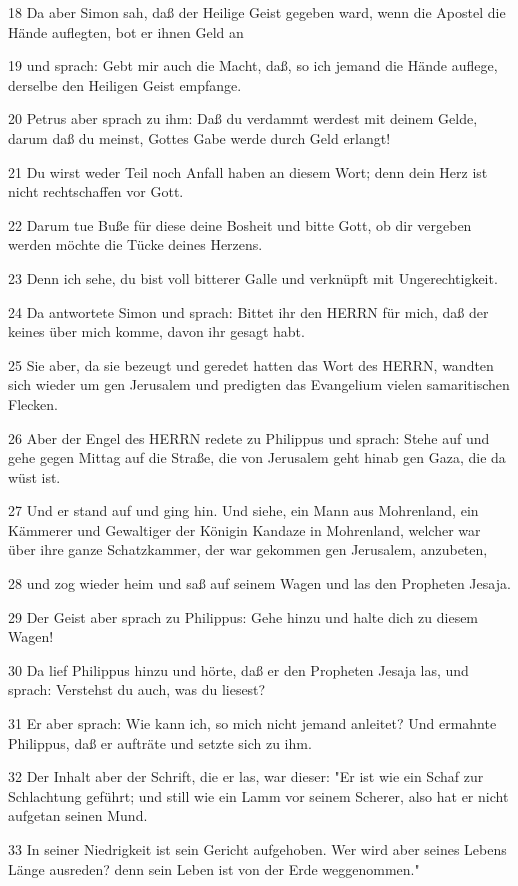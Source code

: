 \par 18 Da aber Simon sah, daß der Heilige Geist gegeben ward, wenn die Apostel die Hände auflegten, bot er ihnen Geld an
\par 19 und sprach: Gebt mir auch die Macht, daß, so ich jemand die Hände auflege, derselbe den Heiligen Geist empfange.
\par 20 Petrus aber sprach zu ihm: Daß du verdammt werdest mit deinem Gelde, darum daß du meinst, Gottes Gabe werde durch Geld erlangt!
\par 21 Du wirst weder Teil noch Anfall haben an diesem Wort; denn dein Herz ist nicht rechtschaffen vor Gott.
\par 22 Darum tue Buße für diese deine Bosheit und bitte Gott, ob dir vergeben werden möchte die Tücke deines Herzens.
\par 23 Denn ich sehe, du bist voll bitterer Galle und verknüpft mit Ungerechtigkeit.
\par 24 Da antwortete Simon und sprach: Bittet ihr den HERRN für mich, daß der keines über mich komme, davon ihr gesagt habt.
\par 25 Sie aber, da sie bezeugt und geredet hatten das Wort des HERRN, wandten sich wieder um gen Jerusalem und predigten das Evangelium vielen samaritischen Flecken.
\par 26 Aber der Engel des HERRN redete zu Philippus und sprach: Stehe auf und gehe gegen Mittag auf die Straße, die von Jerusalem geht hinab gen Gaza, die da wüst ist.
\par 27 Und er stand auf und ging hin. Und siehe, ein Mann aus Mohrenland, ein Kämmerer und Gewaltiger der Königin Kandaze in Mohrenland, welcher war über ihre ganze Schatzkammer, der war gekommen gen Jerusalem, anzubeten,
\par 28 und zog wieder heim und saß auf seinem Wagen und las den Propheten Jesaja.
\par 29 Der Geist aber sprach zu Philippus: Gehe hinzu und halte dich zu diesem Wagen!
\par 30 Da lief Philippus hinzu und hörte, daß er den Propheten Jesaja las, und sprach: Verstehst du auch, was du liesest?
\par 31 Er aber sprach: Wie kann ich, so mich nicht jemand anleitet? Und ermahnte Philippus, daß er aufträte und setzte sich zu ihm.
\par 32 Der Inhalt aber der Schrift, die er las, war dieser: "Er ist wie ein Schaf zur Schlachtung geführt; und still wie ein Lamm vor seinem Scherer, also hat er nicht aufgetan seinen Mund.
\par 33 In seiner Niedrigkeit ist sein Gericht aufgehoben. Wer wird aber seines Lebens Länge ausreden? denn sein Leben ist von der Erde weggenommen."

